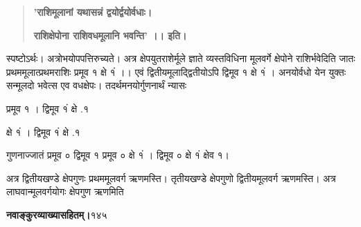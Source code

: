 \documentclass[11pt, openany]{book}
\begin{document}
\begin{sloppypar}
\begin{quote}
\hspace{1in}\textbf{'राशिमूलानां यथासन्नं द्वयोर्द्वयोर्वधाः।}

\hspace{1in}\textbf{राशिक्षेपोना राशिवधमूलानि भवन्ति' ।। इति।}
\end{quote}

\hangindent=0.2in \hspace{0.2in}स्पष्टोऽर्थः। अत्रोभयोपपत्तिरुच्यते। अत्र क्षेपयुतराशेर्मूले ज्ञाते व्यस्तविधिना मूलवर्गे क्षेपोने राशिर्भवेदिति जातः प्रथममूलात्प्रथमराशिः प्रमूव १ क्षे १ं ।। एवं द्वितीयमूलाद्द्वितीयोऽपि द्विमूव १ क्षे १ं । अनयोर्वधो येन युक्तः सन्मूलदो भवेत्स एव वधक्षेपः। तदर्थमनयोर्गुणनार्थं न्यासः

\begin{center}
प्रमूव १ । द्विमूव १ं  क्षे .१

\hspace{0.1in}क्षे १ं । द्विमूव १ं  क्षे .१
\end{center}

\hangindent=0.2in गुणनाज्जातं प्रमूव ० द्विमूव १ प्रमूव ० क्षे १ं । द्विमूव ० क्षे १ं क्षेव १।

\hangindent=0.2in \hspace{0.2in}अत्र द्वितीयखण्डे क्षेपगुणः प्रथममूलवर्ग ऋणमस्ति। तृतीयखण्डे क्षेपगुणो द्वितीयमूलवर्ग ऋणमस्ति। अत्र लाघवान्मूलवर्गयोगः क्षेपगुण ऋणमिति
\end{sloppypar}
\thispagestyle{empty}
\newpage

\onehalfspacing
\hspace{2in}\textbf{नवाङ्कुरव्याख्यासहितम्।}\hspace{2in}१४५

\vspace{5mm}
\end{document}
